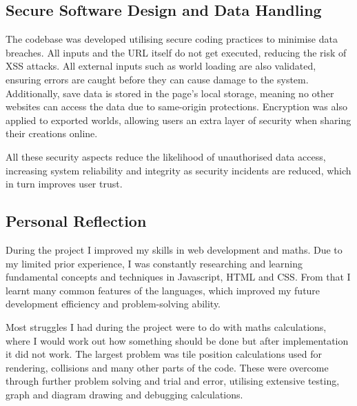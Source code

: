 \documentclass[14pt]{article}
\begin{document}
\subsection{Secure Software Design and Data Handling}
The codebase was developed utilising secure coding practices to minimise data breaches.
All inputs and the URL itself do not get executed, reducing the risk of XSS attacks.
All external inputs such as world loading are also validated, ensuring errors are caught before they can cause damage to the system.
Additionally, save data is stored in the page's local storage, meaning no other websites can access the data due to same-origin protections.
Encryption was also applied to exported worlds, allowing users an extra layer of security when sharing their creations online.

All these security aspects reduce the likelihood of unauthorised data access, increasing system reliability and integrity as security incidents are reduced, which in turn improves user trust.

\subsection{Personal Reflection}
During the project I improved my skills in web development and maths.
Due to my limited prior experience, I was constantly researching and learning fundamental concepts and techniques in Javascript, HTML and CSS.
From that I learnt many common features of the languages, which improved my future development efficiency and problem-solving ability.

Most struggles I had during the project were to do with maths calculations, where I would work out how something should be done but after implementation it did not work.
The largest problem was tile position calculations used for rendering, collisions and many other parts of the code.
These were overcome through further problem solving and trial and error, utilising extensive testing, graph and diagram drawing and debugging calculations.
\end{document}
